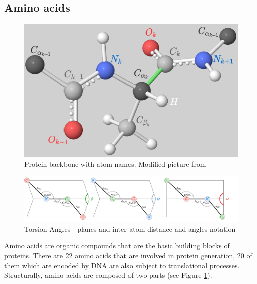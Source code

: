 
\subsection{Amino acids}

\begin{figure}
    \centering
    \includegraphics[scale=0.5]{imgs_tomas/backbone.png}
    \caption{Protein backbone with atom names. Modified picture from \cite{ramachandran}}
    \label{fig:backbone0}
\end{figure}

\begin{figure}
    \centering
    \includegraphics[width=\linewidth]{imgs_tomas/torsion.png}
    \caption{Torsion Angles - planes and inter-atom distance and angles notation}
    \label{fig:torsion}
\end{figure}

Amino acids are organic compounds that are the basic building blocks of proteins. There are 22 amino acids that are involved in protein generation, 20 of them which are encoded by DNA are also subject to translational processes. Structurally, amino acids are composed of two parts (see Figure \ref{fig:backbone0}):

